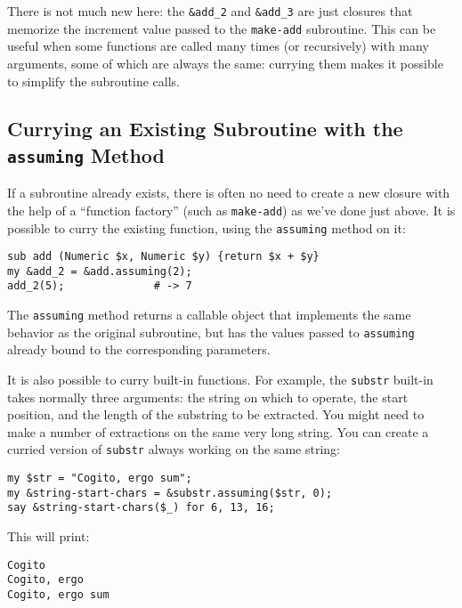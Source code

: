There is not much new here: the \verb'&add_2' and 
\verb'&add_3' are just closures that memorize the 
increment value passed to the {\tt make-add} 
subroutine. This can be useful when some functions 
are called many times (or recursively) with many  
arguments, some of which are always the same: 
currying them makes it possible to simplify the 
subroutine calls.

\subsection{Currying an Existing Subroutine with the {\tt assuming} Method}

If a subroutine already exists, there is often no need 
to create a new closure with the help of a ``function 
factory'' (such as {\tt make-add}) as we've done just above. 
It is possible to curry the existing function, using 
the {\tt assuming} method on it:

\begin{verbatim}
sub add (Numeric $x, Numeric $y) {return $x + $y}   
my &add_2 = &add.assuming(2);                       
add_2(5);              # -> 7                                     
\end{verbatim}

The {\tt assuming} method returns a callable object 
that implements the same behavior as the original 
subroutine, but has the values passed to {\tt assuming}
already bound to the corresponding parameters.

It is also possible to curry built-in functions. For example, 
the {\tt substr} built-in takes normally three arguments:
the string on which to operate, the start position, and the 
length of the substring to be extracted. You might need 
to make a number of extractions on the same very long 
string. You can create a curried version of {\tt substr} 
always working on the same string:

\begin{verbatim}
my $str = "Cogito, ergo sum";                     
my &string-start-chars = &substr.assuming($str, 0);
say &string-start-chars($_) for 6, 13, 16; 
\end{verbatim}

This will print:

\begin{verbatim}
Cogito
Cogito, ergo
Cogito, ergo sum
\end{verbatim}

